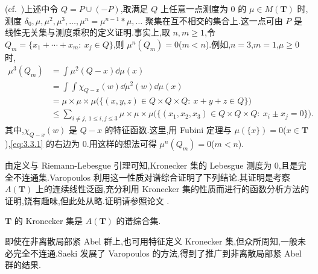 \begin{note}\label{note:3.3.12}
(cf.\ \cite{ch3:11})上述中令 $Q = P \cup (-P)$,取满足 $Q$ 上任意一点测度为 $0$ 的 $\mu \in M(\mathbf{T})$ 时,测度 $\delta_{0}, \mu, \mu^{2}, \mu^{3}, \ldots, \mu^{n} = \mu^{n-1} * \mu, \ldots$ 聚集在互不相交的集合上.这一点可由 $P$ 是线性无关集与测度乘积的定义证明.事实上,取 $n, m \geq 1$,令 $Q_{m} = \{x_{1} + \cdots + x_{m}:\ x_{j} \in Q\}$,则 $\mu^{n}(Q_{m}) = 0$($m < n$).例如,$n = 3$,$m = 1$,$\mu \geq 0$ 时,
\begin{equation}\tag{3.3.1}\begin{aligned}
\mu^{3}(Q_{m}) & = \displaystyle\int \mu^{2}(Q - x)\dd\mu(x) \\
& = \displaystyle\int\!\!\int \chi_{Q-x}(w)\dd\mu^{2}(w)\dd\mu(x) \\
& = \mu \times \mu \times \mu\bigl(\{(x, y, z) \in Q \times Q \times Q:\ x + y + z \in Q\}\bigr) \\
& \leq \sum_{i \neq j,\ 1 \leq i, j \leq 3}\mu \times \mu \times \mu\bigl(\{(x_{1}, x_{2}, x_{3}) \in Q \times Q \times Q:\ x_{i} \pm x_{j} = 0\}\bigr).
\end{aligned}\label{eq:3.3.1}\end{equation}
其中,$\chi_{Q-x}(w)$ 是 $Q - x$ 的特征函数.这里,用 Fubini 定理与 $\mu(\{x\}) = 0$($x \in \mathbf{T}$),\eqref{eq:3.3.1} 的右边为 $0$.用这样的想法可得 $\mu^{n}(Q_{m}) = 0$($m < n$).
\end{note}

由定义与 Riemann-Lebesgue 引理可知,Kronecker 集的 Lebesgue 测度为 $0$,且是完全不连通集.Varopoulos \cite{ch3:50} 利用这一性质对谱综合证明了下列结论.其证明是考察 $A(\mathbf{T})$ 上的连续线性泛函,充分利用 Kronecker 集的性质而进行的函数分析方法的证明,饶有趣味,但此处从略.证明请参照论文 \cite{ch3:50}.

\begin{theorem}\label{thm:3.3.13}
$\mathbf{T}$ 的 Kronecker 集是 $A(\mathbf{T})$ 的谱综合集.
\end{theorem}

即使在非离散局部紧 Abel 群上,也可用特征定义 Kronecker 集,但众所周知,一般未必完全不连通.Saeki \cite{ch3:44} 发展了 Varopoulos \cite{ch3:50} 的方法,得到了推广到非离散局部紧 Abel 群的结果.
